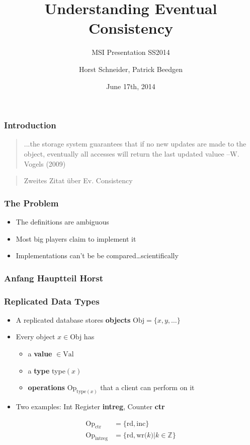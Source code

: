 \documentclass[11pt]{beamer}
\author{Horst Schneider, Patrick Beedgen}
\title{Understanding Eventual Consistency}
\subtitle{MSI Presentation SS2014}
\institute{Hochschule Mannheim}
\date{June 17th, 2014}
\begin{document}
\begin{frame}
\titlepage
\end{frame}


\begin{frame}
\frametitle{Introduction}
\begin{quotation}
\glqq ...the 
storage system guarantees that if no 
new updates are made to the object, 
eventually all accesses will return the 
last updated valuee\grqq
\linebreak
--W. Vogels (2009)
\end{quotation}

\begin{quotation}
\glqq Zweites Zitat über Ev. Consistency \grqq
\end{quotation}
\end{frame}

\begin{frame}
\frametitle{The Problem}
\begin{itemize}
  \item The definitions are ambiguous\linebreak
  \item Most big players claim to implement it\linebreak
  \item Implementations can't be be compared\ldots scientifically

\end{itemize}
\end{frame}

\begin{frame}
\frametitle{Anfang Hauptteil Horst}
\end{frame}

\begin{frame}
\frametitle{Replicated Data Types}
\begin{itemize}
\item A replicated database stores \textbf{objects} \(\mathrm{Obj} = \{x,y,\dots\} \)
\pause
\item Every object \(x \in \mathrm{Obj}\) has
\begin{itemize}
\item a \textbf{value} \(\in \mathrm{Val}\)
\pause
\item a \textbf{type} type\((x)\)
\pause
\item  \textbf{operations} \(\mathrm{Op}_{\mathrm{type}(x)}\) that a client can perform on it
\pause
\end{itemize}
\item Two examples: Int Register \textbf{intreg}, Counter \textbf{ctr}
\end{itemize}

\begin{align*}
\mathrm{Op}_\mathrm{ctr} &= \mathrm{\{rd, inc\}} \\
\mathrm{Op}_\mathrm{intreg} &= \mathrm{\{rd, wr(}k \mathrm{)|} k \in \mathbb{Z} \mathrm{\}}
\end{align*}
\end{frame}
\end{document}

